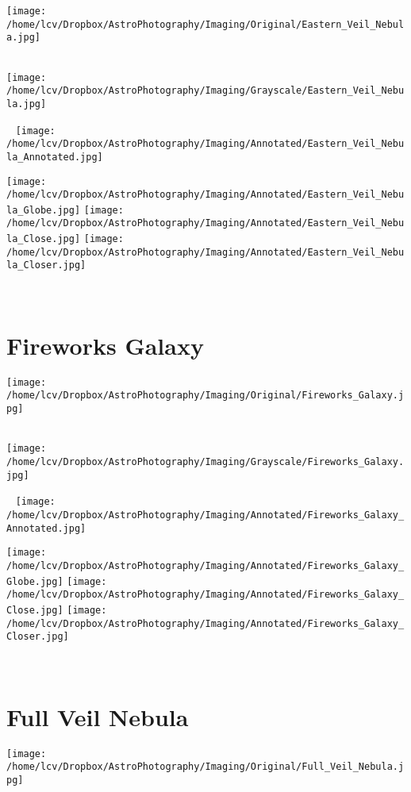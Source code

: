 \texttt{[image: /home/lcv/Dropbox/AstroPhotography/Imaging/Original/Eastern\_Veil\_Nebula.jpg]}
{\footnotesize\color{white}


}\ \\
\texttt{[image: /home/lcv/Dropbox/AstroPhotography/Imaging/Grayscale/Eastern\_Veil\_Nebula.jpg]}
\begin{center}
 \ \newpage
\texttt{[image: /home/lcv/Dropbox/AstroPhotography/Imaging/Annotated/Eastern\_Veil\_Nebula\_Annotated.jpg]}

\texttt{[image: /home/lcv/Dropbox/AstroPhotography/Imaging/Annotated/Eastern\_Veil\_Nebula\_Globe.jpg]}
\texttt{[image: /home/lcv/Dropbox/AstroPhotography/Imaging/Annotated/Eastern\_Veil\_Nebula\_Close.jpg]}
\texttt{[image: /home/lcv/Dropbox/AstroPhotography/Imaging/Annotated/Eastern\_Veil\_Nebula\_Closer.jpg]}
\end{center}
\ \\\section{Fireworks Galaxy}
\texttt{[image: /home/lcv/Dropbox/AstroPhotography/Imaging/Original/Fireworks\_Galaxy.jpg]}
{\footnotesize\color{white}


}\ \\
\texttt{[image: /home/lcv/Dropbox/AstroPhotography/Imaging/Grayscale/Fireworks\_Galaxy.jpg]}
\begin{center}
 \ \newpage
\texttt{[image: /home/lcv/Dropbox/AstroPhotography/Imaging/Annotated/Fireworks\_Galaxy\_Annotated.jpg]}

\texttt{[image: /home/lcv/Dropbox/AstroPhotography/Imaging/Annotated/Fireworks\_Galaxy\_Globe.jpg]}
\texttt{[image: /home/lcv/Dropbox/AstroPhotography/Imaging/Annotated/Fireworks\_Galaxy\_Close.jpg]}
\texttt{[image: /home/lcv/Dropbox/AstroPhotography/Imaging/Annotated/Fireworks\_Galaxy\_Closer.jpg]}
\end{center}
\ \\\section{Full Veil Nebula}
\texttt{[image: /home/lcv/Dropbox/AstroPhotography/Imaging/Original/Full\_Veil\_Nebula.jpg]}
{\footnotesize\color{white}


}\ \\
